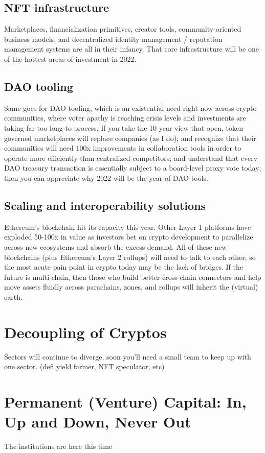 \documentclass{../notes}
\begin{document}
\subsection{NFT infrastructure}
Marketplaces, financialization primitives, creator tools, community-oriented business models, and decentralized identity management / reputation management systems are all in their infancy. That core infrastructure will be one of the hottest areas of investment in 2022.

\subsection{DAO tooling}
Same goes for DAO tooling, which is an existential need right now across crypto communities, where voter apathy is reaching crisis levels and investments are taking far too long to process. If you take the 10 year view that open, token-governed marketplaces will replace companies (as I do); and recognize that their communities will need 100x improvements in collaboration tools in order to operate more efficiently than centralized competitors; and understand that every DAO treasury transaction is essentially subject to a board-level proxy vote today; then you can appreciate why 2022 will be the year of DAO tools.

\subsection{Scaling and interoperability solutions}
Ethereum’s
blockchain hit its capacity this year. Other Layer 1 platforms have exploded 50-100x in value as investors bet on crypto development to parallelize across new ecosystems and absorb the excess demand. All of these new blockchains (plus Ethereum’s Layer 2 rollups) will need to talk to each other, so the most acute pain point in crypto today may be the lack of bridges. If the future is multi-chain, then those who build better cross-chain connectors and help move assets fluidly across parachains, zones, and rollups will inherit the (virtual) earth.
\section{Decoupling of Cryptos}
Sectors will continue to diverge, soon you'll need a small team to keep up with one sector. (defi yield farmer, NFT speculator, etc)

\section{Permanent (Venture) Capital: In, Up and Down, Never Out}
The institutions are here this time 
\end{document}
